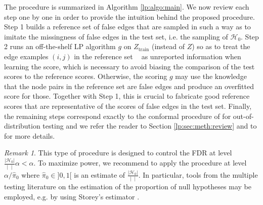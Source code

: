 \documentclass[a4paper, 11pt]{article}
\theoremstyle{remark}
\newtheorem{remark}{Remark}
\renewcommand{\P}{\mathbb{P}}
\DeclareMathOperator{\Dcal}{\cD_{\text{cal}}}
\DeclareMathOperator{\Dtest}{\cD_{\text{test}}}
\newcommand{\Ztr}{Z_{\text{train}}}
\DeclareMathOperator{\cDNull}{\cD^0}
\newcommand{\EM}{\ensuremath}
\newcommand{\cD}{\EM{\mathcal{D}}}
\newcommand{\cH}{\EM{\mathcal{H}}}
\begin{document}
The procedure is summarized in Algorithm \ref{lp:algo:main}. 
We now review each step one by one in order to provide the intuition behind the proposed procedure.
Step 1 builds a reference set of false edges that are sampled in such a way as to imitate the missingness of false edges in the test set, i.e. the sampling of $\cH_0$. %
Step 2 runs an off-the-shelf LP algorithm $g$ on $\Ztr$ (instead of $Z$) so as to treat the edge examples $(i,j)$ in the reference set $\Dcal$ as unreported information when learning the score, which is necessary to avoid biasing the comparison of the test scores to the reference scores.  Otherwise, the scoring $g$ may use the knowledge that the node pairs in the reference set are false edges and produce an overfitted score for those. Together with Step 1, this is crucial to fabricate good reference scores that are representative of the scores of false edges in the test set. Finally, the remaining steps correspond exactly to the conformal procedure of \cite{bates2023testing} for out-of-distribution testing and we refer the reader to Section \ref{lp:sec:meth:review} and to \cite{bates2023testing} for more details. 


\begin{remark} \label{lp:rem:nullprop}
This type of procedure is designed to control the FDR at level $\frac{ \vert \cH_0 \vert} {\vert \Dtest \vert} \alpha < \alpha$. To maximize power, we recommend to apply the procedure at level $\alpha / \hat \pi_0$ where $\hat \pi_0 \in ]0,1[$ is an estimate of $\frac{ \vert \cH_0 \vert} {\vert \Dtest \vert}$. %
In particular, tools from the multiple testing literature on the estimation of the proportion of null hypotheses may be employed, e.g. by using Storey's estimator \citep{marandon22b}. 
\end{remark}
\end{document}
